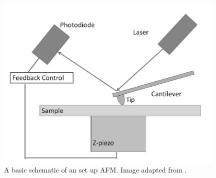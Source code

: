 \newpage

\begin{figure}[h]     %
        \begin{center}
          \includegraphics[width=110mm]{chapter2/RAFMSch.png}
\end{center}
\caption{A basic schematic of an set up AFM. Image adapted from \cite{RAFMSchRef}.}
\label{fig:AFMSch}                 %
\end{figure}


